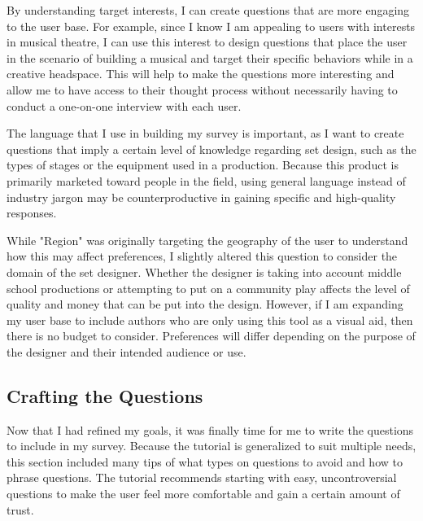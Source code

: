 \documentclass[10pt,twocolumn]{article}
\begin{document}
By understanding target interests, I can create questions that are more engaging to the user base. For example, since I know I am appealing to users with interests in musical theatre, I can use this interest to design questions that place the user in the scenario of building a musical and target their specific behaviors while in a creative headspace. This will help to make the questions more interesting and allow me to have access to their thought process without necessarily having to conduct a one-on-one interview with each user. 

The language that I use in building my survey is important, as I want to create questions that imply a certain level of knowledge regarding set design, such as the types of stages or the equipment used in a production. Because this product is primarily marketed toward people in the field, using general language instead of industry jargon may be counterproductive in gaining specific and high-quality responses. 

While "Region" was originally targeting the geography of the user to understand how this may affect preferences, I slightly altered this question to consider the domain of the set designer. Whether the designer is taking into account middle school productions or attempting to put on a community play affects the level of quality and money that can be put into the design. However, if I am expanding my user base to include authors who are only using this tool as a visual aid, then there is no budget to consider. Preferences will differ depending on the purpose of the designer and their intended audience or use. 
\subsection{Crafting the Questions}
Now that I had refined my goals, it was finally time for me to write the questions to include in my survey. Because the tutorial is generalized to suit multiple needs, this section included many tips of what types on questions to avoid and how to phrase questions. The tutorial recommends starting with easy, uncontroversial questions to make the user feel more comfortable and gain a certain amount of trust. 
\end{document}
